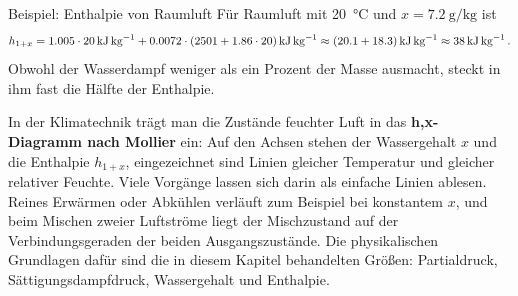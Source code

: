 \begin{examplebox}[]{Beispiel: Enthalpie von Raumluft}
    Für Raumluft mit \SI{20}{\celsius} und $x = \SI{7.2}{\gram\per\kilogram}$ ist
    \begin{equation*}
        h_{1+x} = \num{1.005} \cdot 20\,\si{\kilo\joule\per\kilogram} + \num{0.0072} \cdot \left(2501 + \num{1.86} \cdot 20\right) \si{\kilo\joule\per\kilogram} \approx (\num{20.1} + \num{18.3})\,\si{\kilo\joule\per\kilogram} \approx \SI{38}{\kilo\joule\per\kilogram} \,.
    \end{equation*}
    Obwohl der Wasserdampf weniger als ein Prozent der Masse ausmacht, steckt in ihm fast die Hälfte der Enthalpie.
\end{examplebox}

In der Klimatechnik trägt man die Zustände feuchter Luft in das \textbf{h,x-Diagramm nach Mollier} ein: Auf den Achsen stehen der Wassergehalt $x$ und die Enthalpie $h_{1+x}$, eingezeichnet sind Linien gleicher Temperatur und gleicher relativer Feuchte. Viele Vorgänge lassen sich darin als einfache Linien ablesen. Reines Erwärmen oder Abkühlen verläuft zum Beispiel bei konstantem $x$, und beim Mischen zweier Luftströme liegt der Mischzustand auf der Verbindungsgeraden der beiden Ausgangszustände. Die physikalischen Grundlagen dafür sind die in diesem Kapitel behandelten Größen: Partialdruck, Sättigungsdampfdruck, Wassergehalt und Enthalpie.

\newpage
